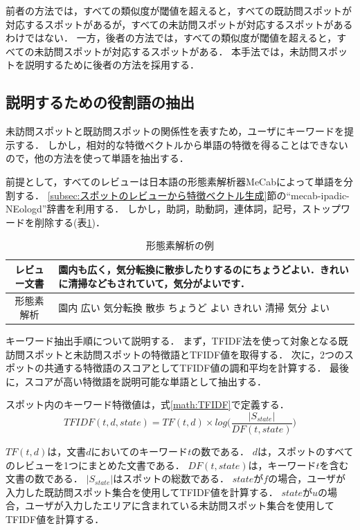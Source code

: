 \documentclass{deimj}
\begin{document}
前者の方法では，すべての類似度が閾値を超えると，すべての既訪問スポットが対応するスポットがあるが，すべての未訪問スポットが対応するスポットがあるわけではない．
一方，後者の方法では，すべての類似度が閾値を超えると，すべての未訪問スポットが対応するスポットがある．
本手法では，未訪問スポットを説明するために後者の方法を採用する．

\subsection{説明するための役割語の抽出}
\label{subsec:説明するための役割語の抽出}
未訪問スポットと既訪問スポットの関係性を表すため，ユーザにキーワードを提示する．
しかし，相対的な特徴ベクトルから単語の特徴を得ることはできないので，他の方法を使って単語を抽出する．

前提として，すべてのレビューは日本語の形態素解析器MeCabによって単語を分割する．
\ref{subsec:スポットのレビューから特徴ベクトル生成}節の``mecab-ipadic-NEologd''辞書を利用する．
しかし，助詞，助動詞，連体詞，記号，ストップワードを削除する(表\ref{table:mecab})．

\begin{table}[t]
  \caption{形態素解析の例}
  \label{table:mecab}
  \centering
    \begin{tabular}{c|p{}} \hline
      レビュー文書 & 園内も広く，気分転換に散歩したりするのにちょうどよい．きれいに清掃などもされていて，気分がよいです．\\
      \hline
      形態素解析 & 園内 広い 気分転換 散歩 ちょうど よい きれい 清掃 気分 よい\\
      \hline
    \end{tabular}
\end{table}

キーワード抽出手順について説明する．
まず，TFIDF法を使って対象となる既訪問スポットと未訪問スポットの特徴語とTFIDF値を取得する．
次に，2つのスポットの共通する特徴語のスコアとしてTFIDF値の調和平均を計算する．
最後に，スコアが高い特徴語を説明可能な単語として抽出する．

スポット内のキーワード特徴値は，式\ref{math:TFIDF}で定義する．
\begin{equation}
  TFIDF(t,d,state) = TF(t,d) \times log\Biggr(\frac{|S_{state}|}{DF(t,state)}\Biggr)
  \label{math:TFIDF}
\end{equation}

$TF(t,d)$は，文書$d$においてのキーワード$t$の数である．
$d$は，スポットのすべてのレビューを1つにまとめた文書である．
$DF(t,state)$は，キーワード$t$を含む文書の数である．
$|S_{state}|$はスポットの総数である．
$state$が$f$の場合，ユーザが入力した既訪問スポット集合を使用してTFIDF値を計算する．
$state$が$u$の場合，ユーザが入力したエリアに含まれている未訪問スポット集合を使用してTFIDF値を計算する．
\end{document}
